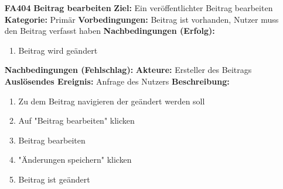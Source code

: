 \documentclass[parskip=full]{scrartcl}
\begin{document}
\begin{itemize}[nosep]
			\item[\textbf{FA404}]\textbf{Beitrag bearbeiten}
			\newline \textbf{Ziel:} Ein veröffentlichter Beitrag bearbeiten
			\newline \textbf{Kategorie:} Primär
			\newline \textbf{Vorbedingungen:} Beitrag ist vorhanden, Nutzer muss den Beitrag verfasst haben
			\newline \textbf{Nachbedingungen (Erfolg):}
			\begin{enumerate}[nosep]
				\item Beitrag wird geändert
			\end{enumerate}
			\textbf{Nachbedingungen (Fehlschlag):}
			\newline \textbf{Akteure:} Ersteller des Beitrags
			\newline \textbf{Auslösendes Ereignis:} Anfrage des Nutzers
			\newline \textbf{Beschreibung:}
			\begin{enumerate}[nosep]
				\item Zu dem Beitrag navigieren der geändert werden soll
				\item Auf "Beitrag bearbeiten" klicken
				\item Beitrag bearbeiten
				\item "Änderungen speichern" klicken
				\item Beitrag ist geändert\\
			\end{enumerate}
			

\end{itemize}
\end{document}
